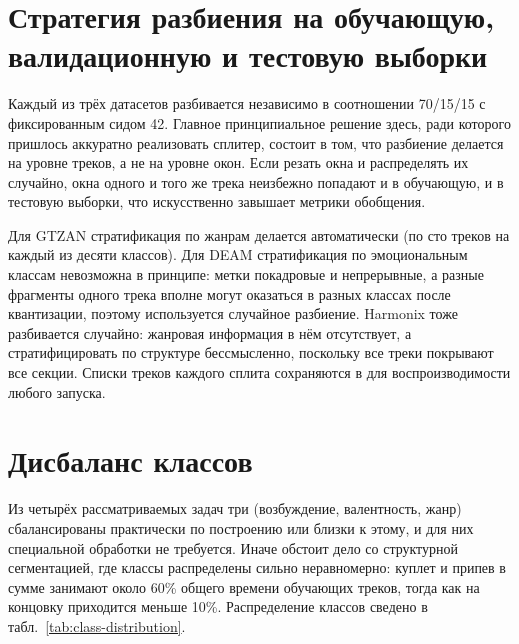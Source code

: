 \section{Стратегия разбиения на обучающую, валидационную и тестовую выборки}\label{sec:3-3}

Каждый из трёх датасетов разбивается независимо в соотношении 70/15/15 с фиксированным сидом 42. Главное принципиальное решение здесь, ради которого пришлось аккуратно реализовать сплитер, состоит в том, что разбиение делается на уровне треков, а не на уровне окон. Если резать окна и распределять их случайно, окна одного и того же трека неизбежно попадают и в обучающую, и в тестовую выборки, что искусственно завышает метрики обобщения.

Для GTZAN стратификация по жанрам делается автоматически (по сто треков на каждый из десяти классов). Для DEAM стратификация по эмоциональным классам невозможна в принципе: метки покадровые и непрерывные, а разные фрагменты одного трека вполне могут оказаться в разных классах после квантизации, поэтому используется случайное разбиение. Harmonix тоже разбивается случайно: жанровая информация в нём отсутствует, а стратифицировать по структуре бессмысленно, поскольку все треки покрывают все секции. Списки треков каждого сплита сохраняются в  для воспроизводимости любого запуска.

\section{Дисбаланс классов}\label{sec:3-4}

Из четырёх рассматриваемых задач три (возбуждение, валентность, жанр) сбалансированы практически по построению или близки к этому, и для них специальной обработки не требуется. Иначе обстоит дело со структурной сегментацией, где классы распределены сильно неравномерно: куплет и припев в сумме занимают около 60\% общего времени обучающих треков, тогда как на концовку приходится меньше 10\%. Распределение классов сведено в табл.~\ref{tab:class-distribution}.

